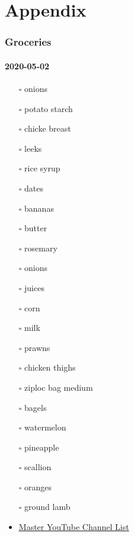 \documentclass[
]{article}
\begin{document}
\hypertarget{part-appendix}{%
\part{Appendix}\label{part-appendix}}

\hypertarget{groceries}{%
\section{Groceries}\label{groceries}}

\hypertarget{section}{%
\subsection{2020-05-02}\label{section}}

\begin{itemize}
\item[$\square$]
  onions
\item[$\square$]
  potato starch
\item[$\square$]
  chicke breast
\item[$\square$]
  leeks
\item[$\square$]
  rice syrup
\item[$\square$]
  dates
\item[$\square$]
  bananas
\item[$\square$]
  butter
\item[$\square$]
  rosemary
\item[$\square$]
  onions
\item[$\square$]
  juices
\item[$\square$]
  corn
\item[$\square$]
  milk
\item[$\square$]
  prawns
\item[$\square$]
  chicken thighs
\item[$\square$]
  ziploc bag medium
\item[$\square$]
  bagels
\item[$\square$]
  watermelon
\item[$\square$]
  pineapple
\item[$\square$]
  scallion
\item[$\square$]
  oranges
\item[$\square$]
  ground lamb
\item
  \href{https://docs.google.com/spreadsheets/d/1fYfqtHZOAavc07rDJOuYSXa5YibxZj-ffWG0-pd5PU4/pubhtml}{Master YouTube Channel List}
\end{itemize}
\end{document}
